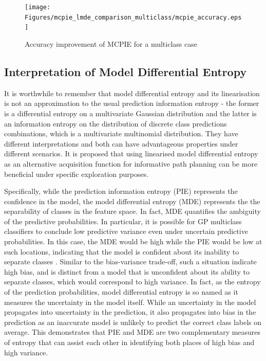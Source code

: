 			\begin{figure}[!htbp]
				\centering
					\texttt{[image: Figures/mcpie\_lmde\_comparison\_multiclass/mcpie\_accuracy.eps]}
				\caption{Accuracy improvement of MCPIE for a multiclass case}
				\label{Figure:mcpie_accuracy_multiclass}
			\end{figure}
			
		\subsection{Interpretation of Model Differential Entropy}
		\label{InformativeSeafloorExploration:ComparisonMutualEntropyMeasures:InterpretationMDE}
		
			It is worthwhile to remember that model differential entropy and its linearisation is not an approximation to the usual prediction information entropy - the former is a differential entropy on a multivariate Gaussian distribution and the latter is an information entropy on the distribution of discrete class predictions combinations, which is a multivariate multinomial distribution. They have different interpretations and both can have advantageous properties under different scenarios. It is proposed that using linearised model differential entropy as an alternative acquisition function for informative path planning can be more beneficial under specific exploration purposes.
			
			Specifically, while the prediction information entropy (PIE) represents the confidence in the model, the model differential entropy (MDE) represents the the separability of classes in the feature space. In fact, MDE quantifies the ambiguity of the predictive probabilities. In particular, it is possible for GP multiclass classifiers to conclude low predictive variance even under uncertain predictive probabilities. In this case, the MDE would be high while the PIE would be low at such locations, indicating that the model is confident about its inability to separate classes \citep{AsherBender}. Similar to the bias-variance trade-off, such a situation indicate high bias, and is distinct from a model that is unconfident about its ability to separate classes, which would correspond to high variance. In fact, as the entropy of the prediction probabilities, model differential entropy is so named as it measures the uncertainty in the model itself. While an uncertainty in the model propagates into uncertainty in the prediction, it also propagates into bias in the prediction as an inaccurate model is unlikely to predict the correct class labels on average. This demonstrates that PIE and MDE are two complementary measures of entropy that can assist each other in identifying both places of high bias and high variance.
			

